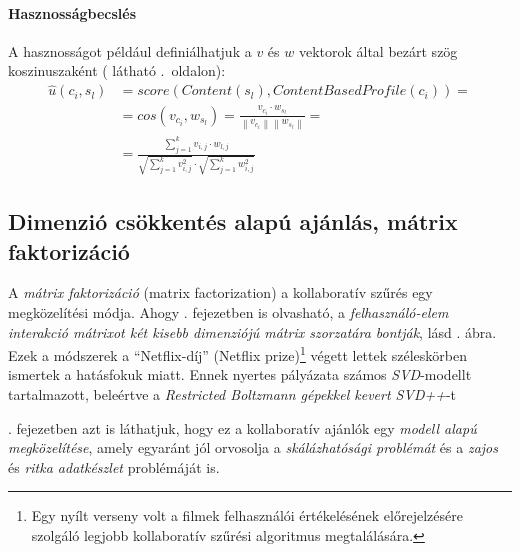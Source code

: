 \documentclass[
]{thesis-ekf}
\theoremstyle{definition}
\theoremstyle{remark}
\begin{document}
\paragraph{Hasznosságbecslés}
A hasznosságot például definiálhatjuk a ${v}$ és ${w}$ vektorok által bezárt szög koszinuszaként ( látható .~oldalon):
\begin{align*}
	\hat{u}(c_{i}, s_{l}) &= score(Content(s_{l}), ContentBasedProfile(c_{i}))= \\
	&=cos({v}_{c_{i}},{w}_{s_{l}})=\frac{{v}_{c_{i}} \cdot {w}_{s_{l}}}{\left \|{v}_{c_{i}}\right \| \left \| {w}_{s_{l}} \right \|}= \\ 
	&=\frac{\sum^{k}_{j=1}v_{i,j}\cdot w_{l,j}}{\sqrt{\sum^{k}_{j=1}v^{2}_{i,j}} \cdot \sqrt{\sum^{k}_{j=1}w^{2}_{i,j}}}
\end{align*}

\subsection{Dimenzió csökkentés alapú ajánlás, mátrix faktorizáció}
\label{subsec-dimenzio-csokkentes}
\label{subsec-matrix-faktorizacio}
A \emph{mátrix faktorizáció} (matrix factorization) a kollaboratív szűrés egy megközelítési módja. Ahogy . fejezetben is olvasható,  a \emph{felhasználó-elem interakció mátrixot két kisebb dimenziójú  mátrix szorzatára bontják}, lásd . ábra. Ezek a módszerek a ``Netflix-díj'' (Netflix prize)\footnote{Egy nyílt verseny volt a filmek felhasználói értékelésének előrejelzésére szolgáló legjobb kollaboratív szűrési algoritmus megtalálására.} végett lettek széleskörben ismertek a hatásfokuk miatt. Ennek nyertes pályázata számos \emph{SVD}-modellt tartalmazott, beleértve a \emph{Restricted Boltzmann gépekkel kevert SVD++}-t\cite{wiki-matrix-factorization, journal-netflix-prize-and-svd}

. fejezetben azt is láthatjuk, hogy ez a kollaboratív ajánlók egy \emph{modell alapú megközelítése}, amely egyaránt jól orvosolja a \emph{skálázhatósági problémát} és a \emph{zajos} és \emph{ritka adatkészlet} problémáját is.
\end{document}
